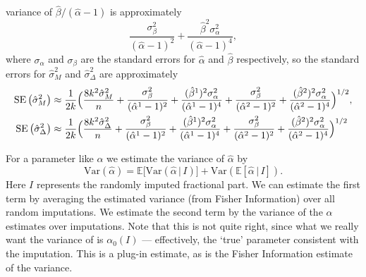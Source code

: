 \documentclass[
]{article}
\begin{document}
variance of \(\hat\beta/(\hat\alpha-1)\) is approximately
\begin{equation}
  \frac{\sigma_\beta^2}{(\hat\alpha-1)^2} + \frac{\hat\beta^2\sigma_\alpha^2}{(\hat\alpha-1)^4},
\end{equation} where \(\sigma_\alpha\) and \(\sigma_\beta\) are the
standard errors for \(\hat\alpha\) and \(\hat\beta\) respectively, so
the standard errors for \(\hat\sigma_M^2\) and \(\hat\sigma_\Delta^2\)
are approximately \begin{align*}
  \operatorname{SE}\left(\hat\sigma_M^2\right)&\approx \frac{1}{2k}\Bigl(\frac{8k^2\hat\sigma_M^2}{n} + \frac{\sigma_\beta^2}{(\hat\alpha^1-1)^2} + \frac{(\hat\beta^1)^2\sigma_\alpha^2}{(\hat\alpha^1-1)^4} + \frac{\sigma_\beta^2}{(\hat\alpha^2-1)^2} + \frac{(\hat\beta^2)^2\sigma_\alpha^2}{(\hat\alpha^2-1)^4} \Bigr)^{1/2},\\
  \operatorname{SE}\left(\hat\sigma_\Delta^2\right)&\approx \frac{1}{2k}\Bigl(\frac{8k^2\hat\sigma_\Delta^2}{n} + \frac{\sigma_\beta^2}{(\hat\alpha^1-1)^2} + \frac{(\hat\beta^1)^2\sigma_\alpha^2}{(\hat\alpha^1-1)^4} + \frac{\sigma_\beta^2}{(\hat\alpha^2-1)^2} + \frac{(\hat\beta^2)^2\sigma_\alpha^2}{(\hat\alpha^2-1)^4} \Bigr)^{1/2}
\end{align*}

For a parameter like \(\alpha\) we estimate the variance of
\(\hat\alpha\) by \newcommand{\E}{\mathbb{E}}
\renewcommand{\P}{\mathbb{P}} \begin{equation}
  \mathrm{Var}(\hat\alpha) = \mathbb{E}\bigl[ \mathrm{Var}\left(\hat\alpha\, |\, I\right)\bigr] + \mathrm{Var}\left(\mathbb{E} \left[ \hat\alpha\, |\, I \right]\right).
\end{equation} Here \(I\) represents the randomly imputed fractional
part. We can estimate the first term by averaging the estimated variance
(from Fisher Information) over all random imputations. We estimate the
second term by the variance of the \(\alpha\) estimates over
imputations. Note that this is not quite right, since what we really
want the variance of is \(\alpha_0(I)\) --- effectively, the `true'
parameter consistent with the imputation. This is a plug-in estimate, as
is the Fisher Information estimate of the variance.
\end{document}

